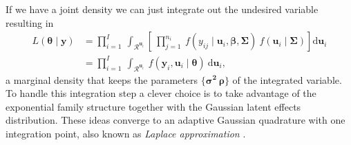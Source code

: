 \documentclass[a4paper,12pt]{article}
\begin{document}
If we have a joint density we can just integrate out the undesired
variable resulting in
\begin{equation}
 \begin{aligned}
  L(\bm{\theta} \mid \bm{y}) &=
  \prod_{i=1}^{I}~\int_{\mathcal{R}^{\bm{u}_{i}}}
  \left[~\prod_{j=1}^{n_{i}}~
         f(y_{ij} \mid \bm{u}_{i}, \bm{\beta,\Sigma})~
         f(\bm{u}_{i} \mid \bm{\Sigma})
  \right]\text{d} \bm{u}_{i}\\
  &= \prod_{i=1}^{I}~\int_{\mathcal{R}^{\bm{u}_{i}}}~
  f(\bm{y}_{i}, \bm{u}_{i} \mid \bm{\theta})~\text{d} \bm{u}_{i},
  \label{eq:generalmarginal}
 \end{aligned}
\end{equation}
a marginal density that keeps the parameters \(\{\bm{\sigma^{2}}~
\bm{\rho}\}\) of the integrated variable. To handle this integration
step a clever choice is to take advantage of the exponential family
structure together with the Gaussian latent effects distribution. These
ideas converge to an adaptive Gaussian quadrature with one integration
point, also known as \textit{Laplace approximation}
\citep{molenberghs&verbeke,LA4H,tierney,corestats}.
\end{document}
